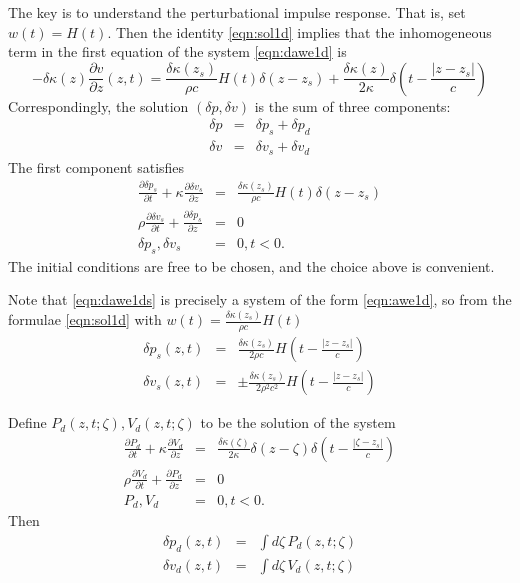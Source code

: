 The key is to understand the perturbational impulse response. That is,
set $w(t)=H(t)$. Then the identity \ref{eqn:sol1d} implies that the
inhomogeneous term in the first equation of the system \ref{eqn:dawe1d}
is 
\begin{equation}
  \label{eqn:pertrhs}
-\delta \kappa(z) \frac{\partial v}{\partial z}(z,t) = \frac{\delta
  \kappa(z_s)}{\rho c}H(t)\delta(z-z_s) +
\frac{\delta\kappa(z)}{2\kappa}\delta\left(t - \frac{|z-z_s|}{c}\right)
\end{equation}
Correspondingly, the solution $(\delta p, \delta v)$ is the sum of
three components:
\begin{eqnarray}
  \label{eqn:pertrhsterms}
  \delta p & = & \delta p_s + \delta p_d \nonumber\\
  \delta v & = & \delta v_s + \delta v_d 
\end{eqnarray}
The first component satisfies
\begin{eqnarray}
  \label{eqn:dawe1ds}
  \frac{\partial \delta p_s}{\partial t} +\kappa\frac{\partial
  \delta v_s}{\partial z}   &=&  \frac{\delta
  \kappa(z_s)}{\rho c}H(t)\delta(z-z_s)\nonumber\\
  \rho \frac{\partial \delta v_s}{\partial t} + \frac{\partial \delta p_s}{\partial
  z}&=&0\nonumber\\
  \delta p_s,\delta v_s&=&0, t < 0.
\end{eqnarray}
The initial conditions are free to be chosen, and the choice above is convenient.

Note that \ref{eqn:dawe1ds} is precisely a system of the form
\ref{eqn:awe1d}, so from the formulae \ref{eqn:sol1d} with $w(t)=\frac{\delta
  \kappa(z_s)}{\rho c}H(t)$
\begin{eqnarray}
\label{eqn:dsol1ds}
\delta p_s(z,t) &=& \frac{\delta
  \kappa(z_s)}{2\rho c}H\left(t - \frac{|z-z_s|}{c}\right) \nonumber \\
\delta v_s(z,t) &=& \pm\frac{\delta \kappa(z_s)}{2\rho^2 c^2}H\left(t - \frac{|z-z_s|}{c}\right)
\end{eqnarray}

Define $P_d(z,t;\zeta), V_d(z,t;\zeta)$ to be the solution of the system
\begin{eqnarray}
  \label{eqn:dawe1dd}
  \frac{\partial P_d}{\partial t} +\kappa\frac{\partial
  V_d}{\partial z}   &=&   \frac{\delta\kappa(\zeta)}{2\kappa}\delta(z-\zeta)\delta\left(t - \frac{|\zeta-z_s|}{c}\right)\nonumber\\
  \rho \frac{\partial V_d}{\partial t} + \frac{\partial P_d}{\partial
  z}&=&0\nonumber\\
  P_d,V_d&=&0, t < 0.
\end{eqnarray}
Then
\begin{eqnarray}
  \label{eqn:intrep1}
  \delta p_d(z,t) & = & \int d\zeta\, P_d(z,t;\zeta)\\
  \delta v_d(z,t) & = & \int d\zeta\, V_d(z,t;\zeta)
\end{eqnarray}


